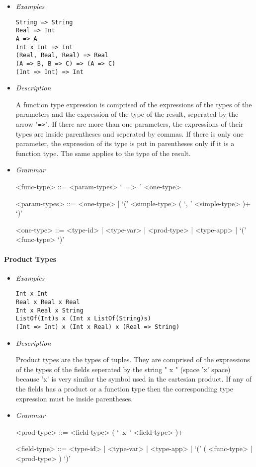 \documentclass{article}
\begin{document}
\begin{itemize}
\item \textit{Examples}
\begin{verbatim}
String => String 
Real => Int
A => A
Int x Int => Int
(Real, Real, Real) => Real
(A => B, B => C) => (A => C)
(Int => Int) => Int
\end{verbatim}

\item \textit{Description}

A function type expression is comprised of the expressions of the types of the
parameters and the expression of the type of the result, seperated by the arrow
"\texttt{=>}". If there are more than one parameters, the expressions of their
types are inside parentheses and seperated by commas. If there is only one
parameter, the expression of its type is put in parentheses only if it is 
a function type. The same applies to the type of the result.

\item \textit{Grammar}
\begin{grammar}
<func-type> ::= <param-types> `\ =>\ ' <one-type>

<param-types> ::= <one-type> | `(' <simple-type> ( `, ' <simple-type> )+ `)'

<one-type> ::=
<type-id> | <type-var> | <prod-type> | <type-app> | `(' <func-type> `)'
\end{grammar}
\end{itemize}

\paragraph{Product Types}

\begin{itemize}
\item \textit{Examples}
\begin{verbatim}
Int x Int
Real x Real x Real
Int x Real x String
ListOf(Int)s x (Int x ListOf(String)s)
(Int => Int) x (Int x Real) x (Real => String)
\end{verbatim}

\item \textit{Description}

Product types are the types of tuples. They are comprised of the expressions of
the types of the fields seperated by the string " x " (space 'x' space) because
'x' is very similar the symbol used in the cartesian product. If any of the
fields has a product or a function type then the corresponding type expression
must be inside parentheses.
\item \textit{Grammar}
\begin{grammar}
<prod-type> ::= <field-type> ( `\ x\ ' <field-type> )+

<field-type> ::=
<type-id> | <type-var> | <type-app> | `(' ( <func-type> | <prod-type> ) `)'
\end{grammar}
\end{itemize}
\end{document}
